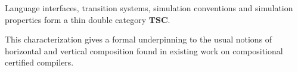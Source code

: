 \documentclass[acmsmall,screen,review,anonymous]{acmart}
\renewcommand{\preceq}{\le}
\begin{document}
\begin{theorem}
Language interfaces,
transition systems,
simulation conventions and
simulation properties
form a thin double category $\mathbf{TSC}$.
\end{theorem}

This characterization
gives a formal underpinning to the usual notions of
horizontal and vertical composition
found in existing work on compositional certified compilers.

%
%
\end{document}
